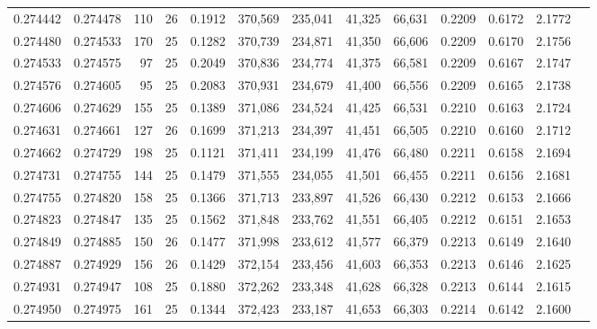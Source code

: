 \begin{tabular}{rrrrrrrrrrrrr}
0.274442 & 0.274478 &   110 &  26 &                                     0.1912 & 370,569 & 235,041 &  41,325 &  66,631 & 0.2209 & 0.6172 & 2.1772 \\
0.274480 & 0.274533 &   170 &  25 &                                     0.1282 & 370,739 & 234,871 &  41,350 &  66,606 & 0.2209 & 0.6170 & 2.1756 \\
0.274533 & 0.274575 &    97 &  25 &                                     0.2049 & 370,836 & 234,774 &  41,375 &  66,581 & 0.2209 & 0.6167 & 2.1747 \\
0.274576 & 0.274605 &    95 &  25 &                                     0.2083 & 370,931 & 234,679 &  41,400 &  66,556 & 0.2209 & 0.6165 & 2.1738 \\
0.274606 & 0.274629 &   155 &  25 &                                     0.1389 & 371,086 & 234,524 &  41,425 &  66,531 & 0.2210 & 0.6163 & 2.1724 \\
0.274631 & 0.274661 &   127 &  26 &                                     0.1699 & 371,213 & 234,397 &  41,451 &  66,505 & 0.2210 & 0.6160 & 2.1712 \\
0.274662 & 0.274729 &   198 &  25 &                                     0.1121 & 371,411 & 234,199 &  41,476 &  66,480 & 0.2211 & 0.6158 & 2.1694 \\
0.274731 & 0.274755 &   144 &  25 &                                     0.1479 & 371,555 & 234,055 &  41,501 &  66,455 & 0.2211 & 0.6156 & 2.1681 \\
0.274755 & 0.274820 &   158 &  25 &                                     0.1366 & 371,713 & 233,897 &  41,526 &  66,430 & 0.2212 & 0.6153 & 2.1666 \\
0.274823 & 0.274847 &   135 &  25 &                                     0.1562 & 371,848 & 233,762 &  41,551 &  66,405 & 0.2212 & 0.6151 & 2.1653 \\
0.274849 & 0.274885 &   150 &  26 &                                     0.1477 & 371,998 & 233,612 &  41,577 &  66,379 & 0.2213 & 0.6149 & 2.1640 \\
0.274887 & 0.274929 &   156 &  26 &                                     0.1429 & 372,154 & 233,456 &  41,603 &  66,353 & 0.2213 & 0.6146 & 2.1625 \\
0.274931 & 0.274947 &   108 &  25 &                                     0.1880 & 372,262 & 233,348 &  41,628 &  66,328 & 0.2213 & 0.6144 & 2.1615 \\
0.274950 & 0.274975 &   161 &  25 &                                     0.1344 & 372,423 & 233,187 &  41,653 &  66,303 & 0.2214 & 0.6142 & 2.1600 \\

\end{tabular}
